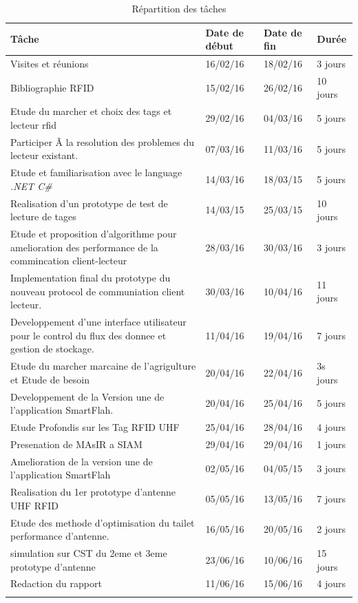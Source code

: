 \documentclass[11pt, a4paper, twoside]{book}
\begin{document}
\begin{longtable}{|p{}|p{}|p{}| p{}|}
\hline
\textbf{Tâche} & \textbf{Date de début} & \textbf{Date de fin} & \textbf{Durée} \\
\hline
Visites et réunions & 16/02/16 & 18/02/16 & 3 jours \\
\hline
Bibliographie RFID & 15/02/16 & 26/02/16 & 10 jours \\
\hline
Etude du marcher et choix des tags et lecteur rfid & 29/02/16 & 04/03/16 & 5 jours \\
\hline
Participer Ã  la resolution des problemes du lecteur existant.
 & 07/03/16 & 11/03/16 & 5 jours \\
\hline
Etude et familiarisation avec le language \emph{.NET C\#} & 14/03/16 & 18/03/15 & 5 jours \\
\hline
Realisation d'un prototype de test de lecture de tages & 14/03/15 & 25/03/15 & 10 jours \\
\hline
 Etude et proposition d'algorithme pour amelioration des performance de la commincation client-lecteur
 & 28/03/16 & 30/03/16 & 3 jours \\
\hline
Implementation final du prototype du nouveau protocol de communiation client lecteur.
 & 30/03/16 & 10/04/16 & 11 jours \\
\hline
Developpement d'une interface utilisateur pour le control du flux des donnee et gestion de stockage.
 & 11/04/16 & 19/04/16 & 7 jours \\
\hline
Etude du marcher marcaine de l'agrigulture et Etude de besoin & 20/04/16 & 22/04/16 & 3s jours \\
\hline
Developpement de la Version une de l'application SmartFlah. & 20/04/16 & 25/04/16 & 5 jours \\
\hline
Etude Profondis sur les Tag RFID UHF  & 25/04/16 & 28/04/16 & 4 jours \\
\hline
Presenation de MAsIR a SIAM  & 29/04/16 & 29/04/16 & 1 jours \\
\hline
Amelioration de la version une de l'application SmartFlah & 02/05/16 & 04/05/15 & 3 jours \\
\hline
Realisation du 1er prototype d'antenne UHF RFID & 05/05/16 & 13/05/16 & 7 jours \\
\hline
Etude des methode d'optimisation du tailet performance d'antenne. & 16/05/16 & 20/05/16 & 2 jours \\
\hline
simulation sur CST du 2eme et 3eme prototype d'antenne & 23/06/16 & 10/06/16 & 15 jours \\
\hline
Redaction du rapport & 11/06/16 & 15/06/16 & 4 jours \\
\hline
\caption{Répartition des tâches}
\end{longtable}
\end{document}
